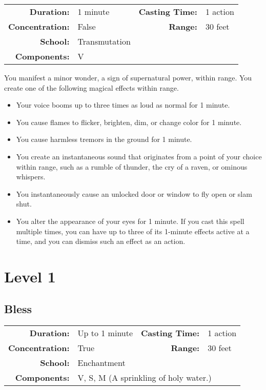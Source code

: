 \documentclass[a5paper, 12pt]{memoir}
\begin{document}
{
\small\centering\vspace{-6pt}
\begin{tabular}{rlrl}
\toprule

\textbf{Duration:} & 1 minute &
\textbf{Casting Time:} & 1 action \\
\textbf{Concentration:} & False &
\textbf{Range:} & 30 feet \\
\textbf{School:} & Transmutation \\
\textbf{Components:} & \multicolumn{3}{p{0.7\textwidth}}{V}\\

\bottomrule
\end{tabular}
}

\vspace{1\baselineskip}\noindent You manifest a minor wonder, a sign of supernatural power, within range. You create one of the following magical effects within range.
\begin{itemize}
    \item Your voice booms up to three times as loud as normal for 1 minute.
    \item You cause flames to flicker, brighten, dim, or change color for 1 minute.
    \item You cause harmless tremors in the ground for 1 minute.
    \item You create an instantaneous sound that originates from a point of your choice within range, such as a rumble of thunder, the cry of a raven, or ominous whispers.
    \item You instantaneously cause an unlocked door or window to fly open or slam shut.
    \item You alter the appearance of your eyes for 1 minute. If you cast this spell multiple times, you can have up to three of its 1-minute effects active at a time, and you can dismiss such an effect as an action.
\end{itemize}


\newpage
\chapter*{Level 1} 
\section*{Bless}

{
\small\centering\vspace{-6pt}
\begin{tabular}{rlrl}
\toprule

\textbf{Duration:} & Up to 1 minute &
\textbf{Casting Time:} & 1 action \\
\textbf{Concentration:} & True &
\textbf{Range:} & 30 feet \\
\textbf{School:} & Enchantment \\
\textbf{Components:} & \multicolumn{3}{p{0.7\textwidth}}{V, S, M (A sprinkling of holy water.)}\\

\bottomrule
\end{tabular}
}
\end{document}
